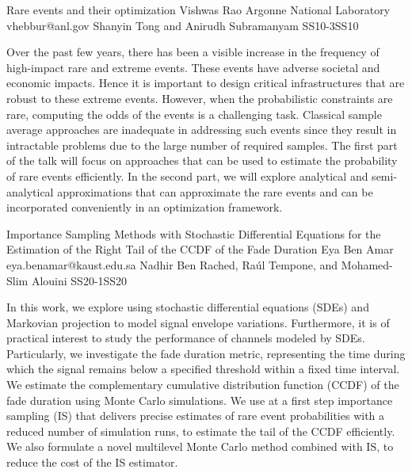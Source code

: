 \begin{talk}
{Rare events and their optimization}
{Vishwas Rao}
{Argonne National Laboratory}
{vhebbur@anl.gov}
{Shanyin Tong and Anirudh Subramanyam }
{}{}{SS10-3}{SS10}



Over the past few years, there has been a visible increase in the frequency of high-impact rare and extreme events. These events have adverse societal and economic impacts. Hence it is important to design critical infrastructures that are robust to these extreme events. However, when the probabilistic constraints are rare, computing the odds of the events is a challenging task. Classical sample average approaches are inadequate in addressing such events since they result in intractable problems due to the large number of required samples. The first part of the talk will focus on approaches that can be used to estimate the probability of rare events efficiently. In the second part, we will explore analytical and semi-analytical approximations that can approximate the rare events and can be incorporated conveniently in an optimization framework.

\end{talk}

\begin{talk}
  {Importance Sampling Methods with Stochastic Differential Equations for the Estimation of the Right Tail of the CCDF of the Fade Duration}%
  {Eya Ben Amar}%
  {}%
  {eya.benamar@kaust.edu.sa}%
  {Nadhir Ben Rached, Ra\'ul Tempone, and Mohamed-Slim Alouini}%
{}{}{SS20-1}{SS20}

			
In this work, we explore using stochastic differential equations (SDEs) and Markovian projection to model signal envelope variations. Furthermore, it is of practical interest to study the performance of channels modeled by SDEs. Particularly, we investigate the fade duration metric, representing the time during which the signal remains below a specified threshold within a fixed time interval. We estimate the complementary cumulative distribution function (CCDF) of the fade duration using Monte Carlo simulations. We use at a first step importance sampling (IS) that delivers precise estimates of rare event probabilities with a reduced number of simulation runs, to estimate the tail of the CCDF efficiently. We also formulate a novel multilevel Monte Carlo method combined with IS, to reduce the cost of the IS estimator. 

\medskip

\end{talk}

